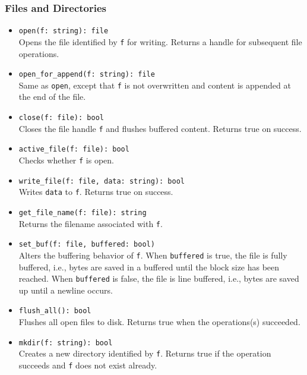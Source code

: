 \documentclass[10pt,landscape]{article}
\begin{document}
\begin{multicols*}{2}
\subsubsection*{Files and Directories}

\begin{itemize}
  \item \verb|open(f: string): file|\\
    Opens the file identified by \texttt{f} for writing. Returns a handle
    for subsequent file operations.
  \item \verb|open_for_append(f: string): file|\\
    Same as \texttt{open}, except that \texttt{f} is not overwritten and
    content is appended at the end of the file.
  \item \verb|close(f: file): bool|\\
    Closes the file handle \texttt{f} and flushes buffered content. Returns
    true on success.
  \item \verb|active_file(f: file): bool|\\
    Checks whether \texttt{f} is open.
  \item \verb|write_file(f: file, data: string): bool|\\
    Writes \texttt{data} to \texttt{f}. Returns true on success.
  \item \verb|get_file_name(f: file): string|\\
    Returns the filename associated with \texttt{f}.
  \item \verb|set_buf(f: file, buffered: bool)|\\
    Alters the buffering behavior of \texttt{f}. When \texttt{buffered} is
    true, the file is fully buffered, i.e., bytes are saved in a buffered until
    the block size has been reached. When \texttt{buffered} is false, the file
    is line buffered, i.e., bytes are saved up until a newline occurs.
  \item \verb|flush_all(): bool|\\
    Flushes all open files to disk.
    Returns true when the operations(s) succeeded.
  \item \verb|mkdir(f: string): bool|\\
    Creates a new directory identified by \texttt{f}. Returns true if the
    operation succeeds and \texttt{f} does not exist already.
\end{itemize}

\end{multicols*}
\end{document}
